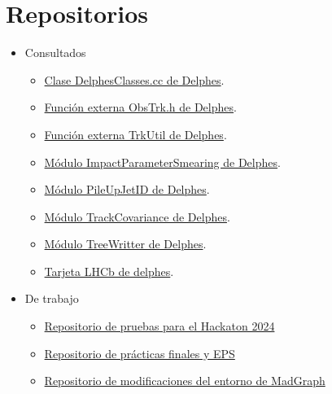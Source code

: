 \section{Repositorios}
\begin{itemize}
    \item[§] Consultados
    \begin{itemize}
        \item \href{https://github.com/delphes/delphes/blob/master/classes/DelphesClasses.cc}{Clase DelphesClasses.cc de Delphes}.
        \item \href{https://github.com/delphes/delphes/blob/master/external/TrackCovariance/ObsTrk.h}{Función externa ObsTrk.h de Delphes}.
        \item \href{https://github.com/delphes/delphes/blob/master/external/TrackCovariance/TrkUtil.cc}{Función externa TrkUtil de Delphes}.
        \item \href{https://github.com/delphes/delphes/blob/master/modules/ImpactParameterSmearing.cc}{Módulo ImpactParameterSmearing de Delphes}.
        \item \href{https://github.com/delphes/delphes/blob/master/modules/PileUpJetID.cc}{Módulo PileUpJetID de Delphes}.
        \item \href{https://github.com/delphes/delphes/blob/master/modules/TrackCovariance.cc}{Módulo TrackCovariance de Delphes}.
        \item \href{https://github.com/delphes/delphes/blob/master/modules/TreeWriter.cc}{Módulo TreeWritter de Delphes}.
        \item \href{https://github.com/delphes/delphes/blob/master/cards/delphes_card_LHCb.tcl}{Tarjeta LHCb de delphes}.
    \end{itemize}
    \item[§] De trabajo
    \begin{itemize}
        \item \href{https://github.com/MASilva139/LHCb-Open-Data}{Repositorio de pruebas para el Hackaton 2024}
        \item \href{https://github.com/MASilva139/ECFM-PF}{Repositorio de prácticas finales y EPS}
        \item \href{https://github.com/MASilva139}{Repositorio de modificaciones del entorno de MadGraph}
    \end{itemize}
\end{itemize}